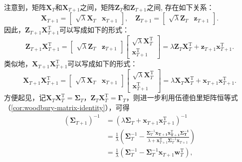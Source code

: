 注意到，矩阵\( \mathbf{X}_T \)和\( \mathbf{X}_{T+1} \)之间，矩阵\( \mathbf{Z}_T \)和\( \mathbf{Z}_{T+1} \)之间, 存在如下关系：
\[
    \mathbf{X}_{T+1} = \begin{bmatrix} \sqrt{\lambda} \mathbf{X}_T & \bm{x}_{T+1} \end{bmatrix}, \quad  \mathbf{Z}_{T+1} = \begin{bmatrix} \sqrt{\lambda} \mathbf{Z}_T & \bm{z}_{T+1} \end{bmatrix}.
\]
因此，\( \mathbf{Z}_{T+1} \mathbf{X}_{T+1}^\mathrm{T} \)可以写成如下的形式：
\[
    \mathbf{Z}_{T+1} \mathbf{X}_{T+1}^\mathrm{T} = \begin{bmatrix} \sqrt{\lambda} \mathbf{Z}_T & \bm{z}_{T+1} \end{bmatrix} \begin{bmatrix}
        \sqrt{\lambda} \mathbf{X}_T^\mathrm{T} \\
        \bm{x}_{T+1}^\mathrm{T}
    \end{bmatrix} = \lambda \mathbf{Z}_T \mathbf{X}_T^\mathrm{T} + \bm{z}_{T+1}\bm{x}_{T+1}^\mathrm{T}.
\]
类似地，\( \mathbf{X}_{T+1}  \mathbf{X}_{T+1}^\mathrm{T} \)可以写成如下的形式：
\[
    \mathbf{X}_{T+1}  \mathbf{X}_{T+1}^\mathrm{T} = \begin{bmatrix} \sqrt{\lambda} \mathbf{X}_T & \bm{x}_{T+1} \end{bmatrix} \begin{bmatrix}
        \sqrt{\lambda} \mathbf{X}_T^\mathrm{T} \\
        \bm{x}_{T+1}^\mathrm{T}
    \end{bmatrix} = \lambda \mathbf{X}_T \mathbf{X}_T^\mathrm{T} + \bm{x}_{T+1}\bm{x}_{T+1}^\mathrm{T}.
\]
方便起见，记\( \mathbf{X}_T \mathbf{X}_T^\mathrm{T} = \mathbf{\Sigma}_T \)，\( \mathbf{Z}_T \mathbf{X}_T^{\mathrm{T}} = \mathbf{\Gamma}_T \)，则进一步利用伍德伯里矩阵恒等式（\cref{cor:woodbury-matrix-identity}），可得
\[
    \begin{split}
        \left( \mathbf{\Sigma}_{T+1} \right)^{-1} & = \left( \lambda \mathbf{\Sigma}_T + \bm{x}_{T+1}\bm{x}_{T+1}^\mathrm{T} \right)^{-1}                                                                                                                                        \\
                                                  & = \frac{1}{\lambda} \left( \mathbf{\Sigma}_T^{-1} - \frac{\mathbf{\Sigma}_T^{-1} \bm{x_{T+1} \bm{x}_{T+1}^\mathrm{T} \mathbf{\Sigma}_T^{-1}}}{\lambda + \bm{x}_{T+1}^\mathrm{T} \mathbf{\Sigma}_T^{-1} \bm{x}_{T+1}} \right) \\
                                                  & = \frac{1}{\lambda} \left( \mathbf{\Sigma}_T^{-1} - \mathbf{\Sigma}_{T}^{-1} \bm{x}_{T+1} \bm{w}_T^{\mathrm{T}} \right),                                                                                                     \\
    \end{split}
\]
